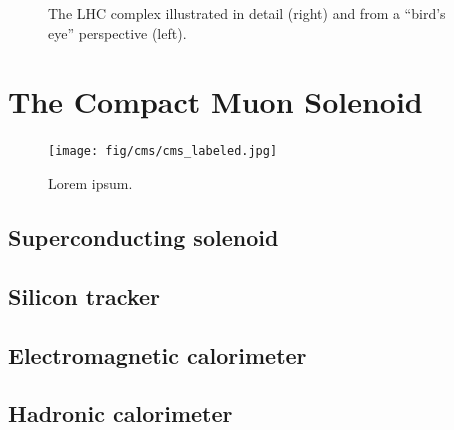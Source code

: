\begin{figure}[htb]
    \centering
    \quad
    \caption{
        The LHC complex illustrated in detail (right) and from a ``bird's eye'' perspective (left). 
    }
    \label{fig:lhc_pics}
\end{figure}

\section{The Compact Muon Solenoid}
\begin{figure}[htb]
    \centering
    \texttt{[image: fig/cms/cms\_labeled.jpg]}
    \caption{
        Lorem ipsum.
    }
    \label{fig:cms_labeled}
\end{figure}
\subsection{Superconducting solenoid}
\subsection{Silicon tracker}
\subsection{Electromagnetic calorimeter}
\subsection{Hadronic calorimeter}
